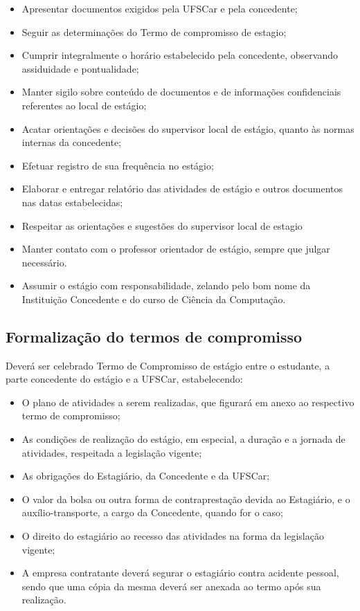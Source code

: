 \begin{itemize}
\item Apresentar documentos exigidos pela UFSCar e pela concedente;
\item Seguir as determinações do Termo de compromisso de estagio;
\item Cumprir integralmente o horário estabelecido pela concedente, observando assiduidade e pontualidade;
\item Manter sigilo sobre conteúdo de documentos e de informações confidenciais referentes ao local de estágio;
\item Acatar orientações e decisões do supervisor local de estágio, quanto às normas internas da concedente;
\item Efetuar registro de sua frequência no estágio;
\item Elaborar e entregar relatório das atividades de estágio e outros documentos nas datas estabelecidas;
\item Respeitar as orientações e sugestões do supervisor local de estagio
\item Manter contato com o professor orientador de estágio, sempre que julgar necessário.
\item Assumir o estágio com responsabilidade, zelando pelo bom nome da Instituição Concedente e do curso de Ciência da Computação.
\end{itemize}

\subsection{Formalização do termos de compromisso}
Deverá ser celebrado Termo de Compromisso de estágio entre o estudante, a parte concedente do estágio e a UFSCar, estabelecendo:

\begin{itemize}
\item O plano de atividades a serem realizadas, que figurará em anexo ao respectivo termo de compromisso;
\item As condições de realização do estágio, em especial, a duração e a jornada de atividades, respeitada a legislação vigente;
\item As obrigações do Estagiário, da Concedente e da UFSCar;
\item O valor da bolsa ou outra forma de contraprestação devida ao Estagiário, e o auxílio-transporte, a cargo da Concedente, quando for o caso; 
\item O direito do estagiário ao recesso das atividades na forma da legislação vigente;
\item A empresa contratante deverá segurar o estagiário contra acidente pessoal, sendo que uma cópia da mesma deverá ser anexada ao termo após sua realização.
\end{itemize}

